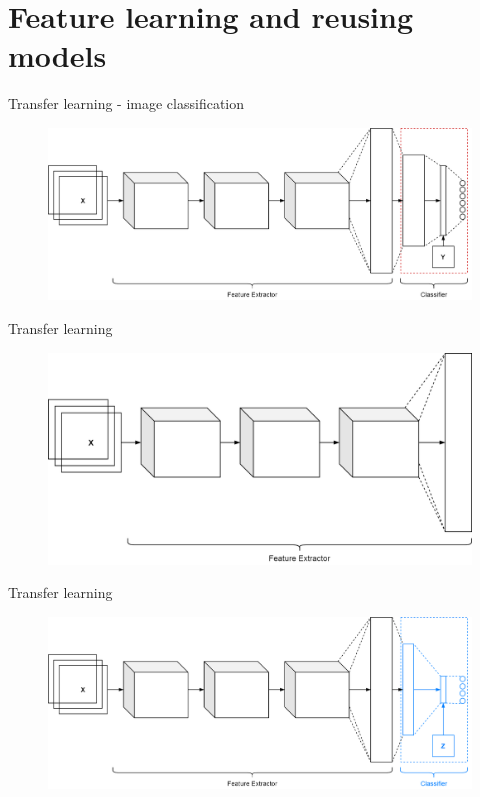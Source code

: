 \section{Feature learning and reusing models}
\begin{frame}{Transfer learning - image classification}
	\begin{center}
		\begin{figure}
			\includegraphics[width=1\textwidth]{figures/deep_cnn_transfer_learning_1}
		\end{figure}
	\end{center}
\end{frame}
\begin{frame}{Transfer learning}
	\begin{center}
		\begin{figure}
			\includegraphics[width=1\textwidth]{figures/deep_cnn_transfer_learning_2}
		\end{figure}
	\end{center}
\end{frame}
\begin{frame}{Transfer learning}
	\begin{center}
		\begin{figure}
			\includegraphics[width=1\textwidth]{figures/deep_cnn_transfer_learning_3}
		\end{figure}
	\end{center}
\end{frame}
